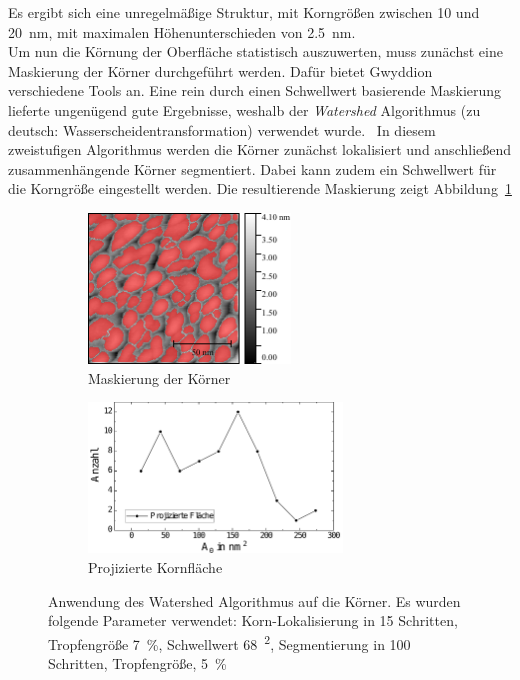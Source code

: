 \documentclass[a4paper,twoside,final]{article}
\begin{document}
Es ergibt sich eine unregelmäßige Struktur, mit Korngrößen zwischen 10 und \SI{20}{\nano\metre}, mit maximalen Höhenunterschieden von \SI{2.5}{\nano\metre}.\\
Um nun die Körnung der Oberfläche statistisch auszuwerten, muss zunächst eine Maskierung der Körner durchgeführt werden. Dafür bietet Gwyddion verschiedene Tools an. Eine rein durch einen Schwellwert basierende Maskierung lieferte ungenügend gute Ergebnisse, weshalb der \textit{Watershed} Algorithmus (zu deutsch: Wasserscheidentransformation) verwendet wurde.~\cite{Gwyddion_documentation} In diesem zweistufigen Algorithmus werden die Körner zunächst lokalisiert und anschließend zusammenhängende Körner segmentiert. Dabei kann zudem ein Schwellwert für die Korngröße eingestellt werden. Die resultierende Maskierung zeigt Abbildung~\ref{fig:Kornflaechen}
\begin{figure}[htp]
    \centering
    \begin{subfigure}{0.45\textwidth}
        \includegraphics[height=4cm]{Bilder/Image01963_Korngroessen.pdf}
        \caption{Maskierung der Körner}
    \end{subfigure}
    \hspace{0.5cm}
    \begin{subfigure}{0.45\textwidth}
        \includegraphics[height=4cm]{Bilder/Image01963_ProjizierteFlaeche.pdf}
        \caption{Projizierte Kornfläche}
    \end{subfigure}
    \caption{Anwendung des Watershed Algorithmus auf die Körner. Es wurden folgende Parameter verwendet: Korn-Lokalisierung in 15 Schritten, Tropfengröße \SI{7}{\percent}, Schwellwert \SI{68}{\squared}, Segmentierung in 100 Schritten, Tropfengröße, \SI{5}{\percent}}
    \label{fig:Kornflaechen}
\end{figure}\\
\end{document}

